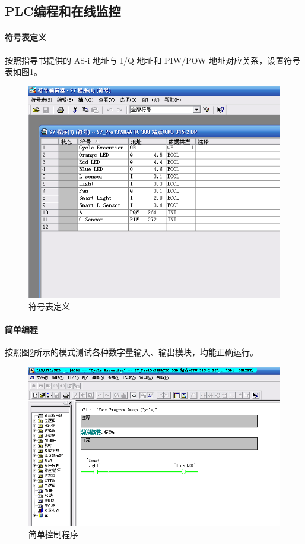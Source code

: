 \subsection{PLC编程和在线监控}
\paragraph{符号表定义}
按照指导书提供的 AS-i 地址与 I/Q 地址和 PIW/POW 地址对应关系，设置符号表如图\ref{fig:sign_form}。

\begin{figure}[htbp]
\centering
\includegraphics[width=12cm]{resource/sign_form.png}
\caption{符号表定义}
\label{fig:sign_form}
\end{figure}

\paragraph{简单编程}
按照图\ref{fig:easy}所示的模式测试各种数字量输入、输出模块，均能正确运行。

\begin{figure}[htbp]
\centering
\includegraphics[width=12cm]{resource/program_easy.png}
\caption{简单控制程序}
\label{fig:easy}
\end{figure}

